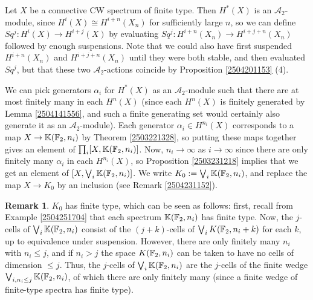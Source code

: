 \documentclass[11pt, titlepage]{article} %
\def\bb{\ensuremath\mathbb}
\def\A{\ensuremath{\mathscr{A}_2}}
\def\textcolour{\textcolor}
\numberwithin{equation}{subsection}
\theoremstyle{plain}
\theoremstyle{definition}
\newtheorem{remark}[theorem]{Remark}
\begin{document}
Let \(X\) be a connective CW spectrum of finite type. Then \(H^*(X)\) is an \(\A\)-module, since \(H^i(X)\cong H^{i+n}(X_n)\) for sufficiently large \(n\), so we can define \(Sq^j : H^i(X)\to H^{i+j}(X)\) by evaluating \(Sq^j : H^{i+n}(X_n)\to H^{i+j+n}(X_n)\) followed by enough suspensions. Note that we could also have first suspended \(H^{i+n}(X_n)\) and \(H^{i+j+n}(X_n)\) until they were both stable, and then evaluated \(Sq^j\), but that these two \(\A\)-actions coincide by Proposition \ref{2504201153} (4). %

We can pick generators \(\alpha_i\) for \(H^*(X)\) as an \(\mathscr{A}_2\)-module such that there are at most finitely many in each \(H^n(X)\) (since each \(H^n(X)\) is finitely generated by Lemma  \ref{2504141556}, and such a finite generating set would certainly also generate it as an \(\A\)-module). Each generator \(\alpha_i\in H^{n_i}(X)\) corresponds to a map \(X \to \bb{K}(\bb{F}_2, n_i)\) by Theorem \ref{2503221328}, so putting these maps together gives an element of \(\prod_i [X, \bb{K}(\bb{F}_2, n_i)]\). Now, \(n_i \to\infty\) as \(i\to \infty\) since there are only finitely many \(\alpha_i\) in each \(H^{n_i}(X)\), so Proposition \ref{2503231218} implies that we get an element of \([X, \bigvee_i \bb{K}(\bb{F}_2, n_i)]\).  We write \(K_0 := \bigvee_i \bb{K}(\bb{F}_2, n_i)\), and replace the map \(X \to K_0\) by an inclusion (see Remark \ref{2504231152}).

\begin{remark}
\(K_0\) has finite type, which can be seen as follows: first, recall from Example \ref{2504251704} that each spectrum \(\bb{K}(\bb{F}_2, n_i)\) has finite type. Now, the \(j\)-cells of \(\bigvee_i \bb{K}(\bb{F}_2, n_i)\) consist of the \((j+k)\)-cells of \(\bigvee_i K(\bb{F}_2, n_i+k)\) for each \(k\), up to equivalence under suspension. However, there are only finitely many \(n_i\) with \(n_i\leq j\), and if \(n_i>j\) the space \(K(\bb{F}_2, n_i)\) can be taken to have no cells of dimension \(\leq j\). Thus, the \(j\)-cells of \(\bigvee_i \bb{K}(\bb{F}_2, n_i)\) are the \(j\)-cells of the finite wedge \(\bigvee_{i, n_i\leq j}\bb{K}(\bb{F}_2, n_i)\), of which there are only finitely many (since a finite wedge of finite-type spectra has finite type). 
\end{remark}
\end{document}
